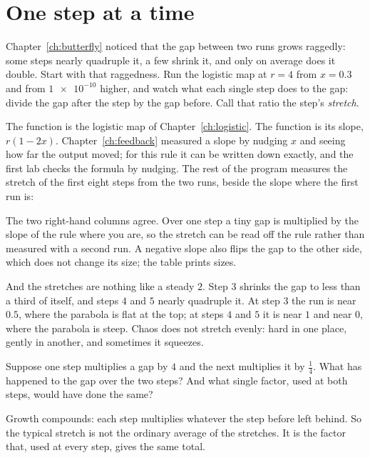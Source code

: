 \section{One step at a time}
\label{sec:ch07-stretch}

\noindent
Chapter~\ref{ch:butterfly} noticed that the gap between two runs grows
raggedly: some steps nearly quadruple it, a few shrink it, and only on
average does it double. Start with that raggedness. Run the logistic map at
$r = 4$ from $x = \num{0.3}$ and from $\num{1e-10}$ higher, and watch what
each single step does to the gap: divide the gap after the step by the gap
before. Call that ratio the step's \emph{stretch}.


\noindent
The function  is the logistic map of Chapter~\ref{ch:logistic}.
The function  is its slope, $r(1 - 2x)$. Chapter~\ref{ch:feedback}
measured a slope by nudging $x$ and seeing how far the output moved; for this
rule it can be written down exactly, and the first lab checks the formula by
nudging. The rest of the program measures the stretch of the first eight
steps from the two runs, beside the slope where the first run is:



\noindent
The two right-hand columns agree. Over one step a tiny gap is multiplied by
the slope of the rule where you are, so the stretch can be read off the rule
rather than measured with a second run. A negative slope also flips the gap
to the other side, which does not change its size; the table prints sizes.

And the stretches are nothing like a steady $2$. Step $3$ shrinks the gap to
less than a third of itself, and steps $4$ and $5$ nearly quadruple it. At
step $3$ the run is near $\num{0.5}$, where the parabola is flat at the top;
at steps $4$ and $5$ it is near $1$ and near $0$, where the parabola is
steep. Chaos does not stretch evenly: hard in one place, gently in another,
and sometimes it squeezes.

\begin{think}
Suppose one step multiplies a gap by $4$ and the next multiplies it by
$\tfrac14$. What has happened to the gap over the two steps? And what single
factor, used at both steps, would have done the same?
\end{think}
Growth compounds: each step multiplies whatever the step before left behind.
So the typical stretch is not the ordinary average of the stretches. It is
the factor that, used at every step, gives the same total.

